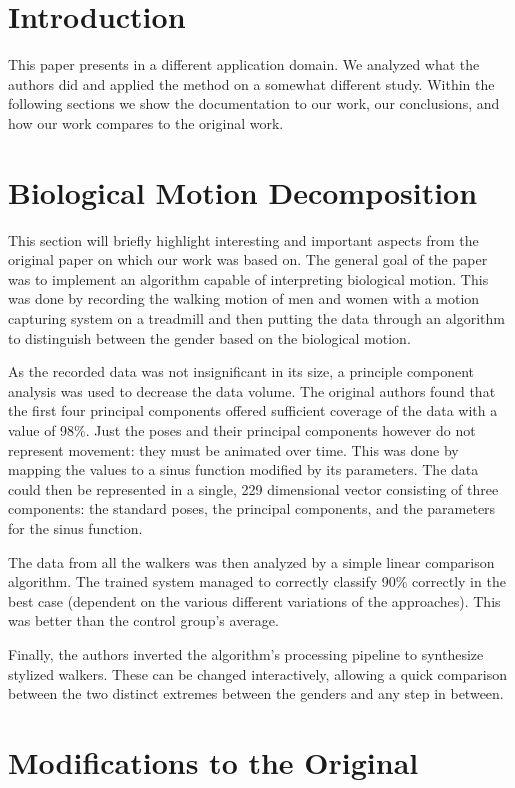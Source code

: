 \documentclass[a4paper]{article}
\begin{document}
\section{Introduction}

This paper presents \cite{origin} in a different application domain.
We analyzed what the authors did and applied the method on a somewhat different study.
Within the following sections we show the documentation to our work, our conclusions, and how our work compares to the original work.

\section{Biological Motion Decomposition}

This section will briefly highlight interesting and important aspects from the original paper on which our work was based on.
The general goal of the paper was to implement an algorithm capable of interpreting biological motion.
This was done by recording the walking motion of men and women with a motion capturing system on a treadmill and then putting the data through an algorithm to distinguish between the gender based on the biological motion.

As the recorded data was not insignificant in its size, a principle component analysis was used to decrease the data volume.
The original authors found that the first four principal components offered sufficient coverage of the data with a value of 98\%.
Just the poses and their principal components however do not represent movement: they must be animated over time.
This was done by mapping the values to a sinus function modified by its parameters.
The data could then be represented in a single, 229 dimensional vector consisting of three components: the standard poses, the principal components, and the parameters for the sinus function.

The data from all the walkers was then analyzed by a simple linear comparison algorithm.
The trained system managed to correctly classify 90\% correctly in the best case (dependent on the various different variations of the approaches).
This was better than the control group's average.

Finally, the authors inverted the algorithm's processing pipeline to synthesize stylized walkers.
These can be changed interactively, allowing a quick comparison between the two distinct extremes between the genders and any step in between.

\section{Modifications to the Original}
\end{document}
